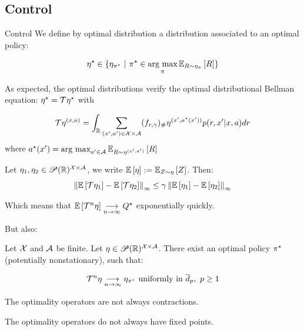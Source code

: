 \documentclass[10pt]{beamer}
\begin{document}
\subsection*{Control}
\begin{frame}{Control}
    We define by optimal distribution a distribution associated to an optimal policy: 

\[    \sta\eta \in \{ \eta_{\sta\pi} \ | \ \sta\pi \in \argmax_{\pi} \EEE{R \sim \eta_\pi}{R}\}
\]

    As expected, the optimal distributions verify the optimal distributional Bellman equation: $\eta^{\star} = \mathcal{T}\eta^{\star}$ with 

\[
    \mathcal{T}\eta^{(x,a)} = \int_{\mathbb{R}} \sum_{(x^\prime,a^\prime)\in \mathcal{X} \times \mathcal{A}} (f_{r,\gamma})_\#\eta^{(x^\prime,a^{\star}(x^\prime))}p(r,x^\prime|x,a)dr
\]
where $a^{\star}(x^\prime) = \operatorname*{\mbox{arg max}}_{a^\prime \in \mathcal{A}} \mathbb{E}_{R \sim \eta^{(x^\prime, a^\prime)}}\left[ R \right]$
\end{frame}

\begin{frame}
    \begin{lemma}
        Let $\eta_1, \eta_2 \in \mathscr{P}(\mathbb{R})^{\mathcal{X}\times\mathcal{A}}$, we write $\mathbb{E}\left[ \eta \right]:= \mathbb{E}_{Z \sim \eta}\left[ Z \right]$. Then:
        \[ \left\lVert\mathbb{E}\left[ \mathcal{T}\eta_1 \right] - \mathbb{E}\left[ \mathcal{T}\eta_2 \right]\right\rVert_\infty \leq \gamma \left\lVert\mathbb{E}\left[ \eta_1 \right] - \mathbb{E}\left[ \eta_2 \right]\right\rVert_\infty \]  
    
        Which means that $\mathbb{E}\left[ \mathcal{T}^n \eta \right] \underset{n \rightarrow \infty}{\longrightarrow} Q^{\star}$ exponentially quickly.
    \end{lemma}
    
    But also:

    \begin{theorem}
        Let $\mathcal{X}$ and $\mathcal{A}$ be finite. Let $\eta \in \mathscr{P}(\mathbb{R})^{\mathcal{X}\times\mathcal{A}}$. There exist an optimal policy $\pi^{\star}$ (potentially nonstationary), such that: 
        
        \[\mathcal{T}^n \eta \underset{n \rightarrow \infty}{\longrightarrow} \eta_{\pi^{\star}} \text{ uniformly in } \overline{d}_p, \ p\geq1\]
    \end{theorem}
\end{frame}

\begin{frame}
    \begin{proposition}
        The optimality operators are not always contractions.
    \end{proposition}
    
    \begin{proposition}
        The optimality operators do not always have fixed points.
    \end{proposition}
\end{frame}
\end{document}
